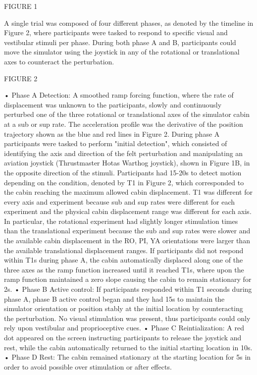 \documentclass[11pt, onecolumn]{article}
\begin{document}
FIGURE 1

A single trial was composed of four different phases, as denoted by the timeline in Figure 2, where participants were tasked to respond to specific visual and vestibular stimuli per phase.  During both phase A and B, participants could move the simulator using the joystick in any of the rotational or translational axes to counteract the perturbation.

FIGURE 2

    • Phase A Detection:  A smoothed ramp forcing function, where the rate of displacement was unknown to the participants, slowly and continuously perturbed one of the three rotational or translational axes of the simulator cabin at a sub or sup rate.  The acceleration profile was the derivative of the position trajectory shown as the blue and red lines in Figure 2.  During phase A participants were tasked to perform "initial detection", which consisted of identifying the axis and direction of the felt perturbation and manipulating an aviation joystick (Thrustmaster Hotas Warthog joystick), shown in Figure 1B, in the opposite direction of the stimuli.  Participants had 15-20s to detect motion depending on the condition, denoted by T1 in Figure 2, which corresponded to the cabin reaching the maximum allowed cabin displacement.  T1 was different for every axis and experiment because sub and sup rates were different for each experiment and the physical cabin displacement range was different for each axis.  In particular, the rotational experiment had slightly longer stimulation times than the translational experiment because the sub and sup rates were slower and the available cabin displacement in the RO, PI, YA orientations were larger than the available translational displacement ranges.  If participants did not respond within T1s during phase A, the cabin automatically displaced along one of the three axes as the ramp function increased until it reached T1s, where upon the ramp function maintained a zero slope causing the cabin to remain stationary for 2s.
    • Phase B Active control: If participants responded within T1 seconds during phase A, phase B active control began and they had 15s to maintain the simulator orientation or position stably at the initial location by counteracting the perturbation.  No visual stimulation was present, thus participants could only rely upon vestibular and proprioceptive cues.
    • Phase C Reintialization: A red dot appeared on the screen instructing participants to release the joystick and rest, while the cabin automatically returned to the initial starting location in 10s. 
    • Phase D Rest: The cabin remained stationary at the starting location for 5s in order to avoid possible over stimulation or after effects.
\end{document}
